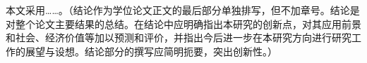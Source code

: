 
\begin{conclusion}

本文采用……。{\color{blue}（结论作为学位论文正文的最后部分单独排写，但不加章号。结论是对整个论文主要结果的总结。在结论中应明确指出本研究的创新点，对其应用前景和社会、经济价值等加以预测和评价，并指出今后进一步在本研究方向进行研究工作的展望与设想。结论部分的撰写应简明扼要，突出创新性。）}

\end{conclusion}
